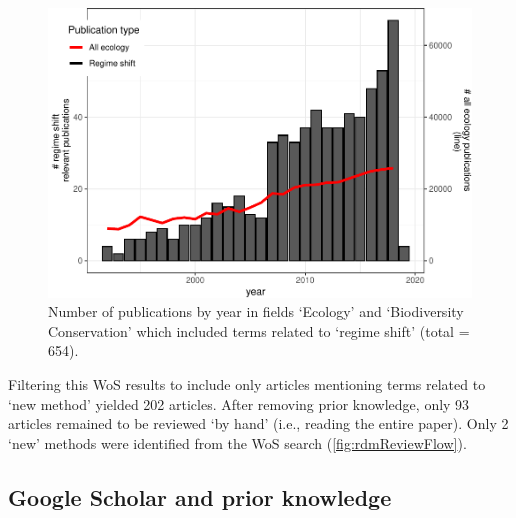 \documentclass[12pt,twoside,openany]{reedthesis}
\begin{document}
\begin{figure}
\centering
\includegraphics{_myDissertation_files/figure-latex/wosRegimePubsByYearwithNumEcolPubs-1.pdf}
\caption{\label{fig:wosRegimePubsByYearwithNumEcolPubs}Number of publications by year in fields `Ecology' and `Biodiversity Conservation' which included terms related to `regime shift' (total = 654).}
\end{figure}
Filtering this WoS results to include only articles mentioning terms related to `new method' yielded 202 articles. After removing prior knowledge, only 93 articles remained to be reviewed `by hand' (i.e., reading the entire paper). Only 2 `new' methods were identified from the WoS search (\ref{fig:rdmReviewFlow}).

\hypertarget{google-scholar-and-prior-knowledge}{%
\subsection{Google Scholar and prior knowledge}\label{google-scholar-and-prior-knowledge}}
\end{document}

